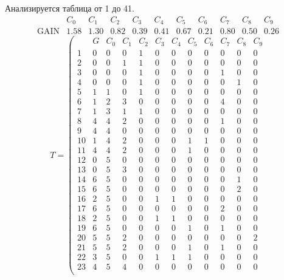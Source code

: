 
Анализируется таблица от 1 до 41.
$$ 
\begin{array}{l|c|ccccccccc}
	  & C_{0} & C_{1} & C_{2} & C_{3} & C_{4} & C_{5} & C_{6} & C_{7} & C_{8} & C_{9}\\
 \textrm{GAIN} & 1.58 & 1.30 & 0.82 & 0.39 & 0.41 & 0.67 & 0.21 & 0.80 & 0.50 & 0.26
\end{array}
 $$
$$
T = \left( \begin{array}{lc|c|ccccccccc}
	 & G & C_{0} & C_{1} & C_{2} & C_{3} & C_{4} & C_{5} & C_{6} & C_{7} & C_{8} & C_{9}\\
	1 & 0 & 0 & 0 & 1 & 0 & 0 & 0 & 0 & 0 & 0 & 0\\
	2 & 0 & 0 & 1 & 1 & 0 & 0 & 0 & 0 & 0 & 0 & 0\\
	3 & 0 & 0 & 0 & 1 & 0 & 0 & 0 & 0 & 1 & 0 & 0\\
	4 & 0 & 0 & 0 & 1 & 0 & 0 & 0 & 0 & 0 & 1 & 0\\
	5 & 1 & 1 & 0 & 1 & 0 & 0 & 0 & 0 & 0 & 0 & 0\\
	6 & 1 & 2 & 3 & 0 & 0 & 0 & 0 & 0 & 4 & 0 & 0\\
	7 & 1 & 3 & 1 & 1 & 0 & 0 & 0 & 0 & 0 & 0 & 0\\
	8 & 4 & 4 & 2 & 0 & 0 & 0 & 0 & 0 & 1 & 0 & 0\\
	9 & 4 & 4 & 0 & 0 & 0 & 0 & 0 & 0 & 0 & 0 & 0\\
	10 & 1 & 4 & 2 & 0 & 0 & 0 & 1 & 1 & 0 & 0 & 0\\
	11 & 4 & 4 & 2 & 0 & 0 & 0 & 1 & 0 & 0 & 0 & 0\\
	12 & 0 & 5 & 0 & 0 & 0 & 0 & 0 & 0 & 0 & 0 & 0\\
	13 & 0 & 5 & 3 & 0 & 0 & 0 & 0 & 0 & 0 & 0 & 0\\
	14 & 6 & 5 & 0 & 0 & 0 & 0 & 0 & 0 & 0 & 1 & 0\\
	15 & 6 & 5 & 0 & 0 & 0 & 0 & 0 & 0 & 0 & 2 & 0\\
	16 & 2 & 5 & 0 & 0 & 1 & 1 & 0 & 0 & 0 & 0 & 0\\
	17 & 6 & 5 & 0 & 0 & 0 & 0 & 0 & 0 & 2 & 0 & 0\\
	18 & 2 & 5 & 0 & 0 & 1 & 1 & 0 & 0 & 0 & 0 & 0\\
	19 & 6 & 5 & 0 & 0 & 0 & 0 & 1 & 0 & 1 & 0 & 0\\
	20 & 5 & 5 & 2 & 0 & 0 & 0 & 0 & 0 & 0 & 0 & 2\\
	21 & 5 & 5 & 2 & 0 & 0 & 0 & 1 & 0 & 1 & 0 & 0\\
	22 & 3 & 5 & 0 & 0 & 1 & 1 & 1 & 0 & 0 & 0 & 0\\
	23 & 4 & 5 & 4 & 0 & 0 & 0 & 0 & 0 & 0 & 0 & 0\\

\end{array}$$
